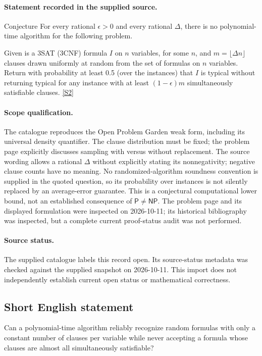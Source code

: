 \documentclass[11pt]{article}
\begin{document}
\paragraph{Statement recorded in the supplied source.}
Conjecture For every rational $\epsilon > 0$ and every rational $\Delta$, there is no polynomial-time algorithm for the following problem.

Given is a 3SAT (3CNF) formula $I$ on $n$ variables, for some $n$, and $m = \lfloor\Delta n\rfloor$ clauses drawn uniformly at random from the set of formulas on $n$ variables. Return with probability at least 0.5 (over the instances) that $I$ is typical without returning typical for any instance with at least $(1 - \epsilon)m$ simultaneously satisfiable clauses. \href{http://www.openproblemgarden.org/op/refuting_random_3sat_instances_on_o_n_clauses_weak_form}{[S2]}
\paragraph{Scope qualification.}
The catalogue reproduces the Open Problem Garden weak form, including its universal density quantifier. The clause distribution must be fixed; the problem page explicitly discusses sampling with versus without replacement. The source wording allows a rational $\Delta$ without explicitly stating its nonnegativity; negative clause counts have no meaning. No randomized-algorithm soundness convention is supplied in the quoted question, so its probability over instances is not silently replaced by an average-error guarantee. This is a conjectural computational lower bound, not an established consequence of $\mathsf{P}\ne\mathsf{NP}$. The problem page and its displayed formulation were inspected on 2026-10-11; its historical bibliography was inspected, but a complete current proof-status audit was not performed.
\paragraph{Source status.}
The supplied catalogue labels this record open. Its source-status metadata was checked against the supplied snapshot on 2026-10-11. This import does not independently establish current open status or mathematical correctness.
\subsection{Short English statement}
Can a polynomial-time algorithm reliably recognize random formulas with only a constant number of clauses per variable while never accepting a formula whose clauses are almost all simultaneously satisfiable?
\end{document}
